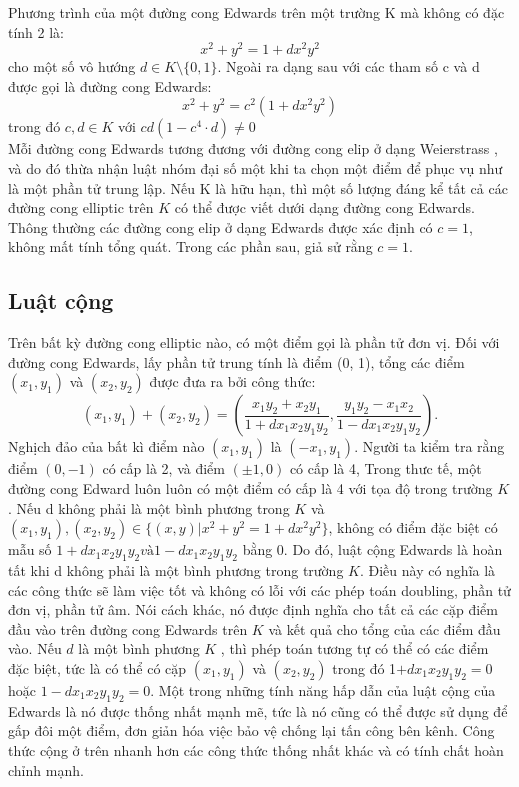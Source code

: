 \documentclass[a4paper,12pt]{report}
\begin{document}
Phương trình của một đường cong Edwards trên một trường K mà không có đặc tính 2 là:
\begin{displaymath}
x^{2}+y^{2}=1+dx^{2}y^{2}
\end{displaymath}
cho một số vô hướng  $d \in K \setminus \{0,1\}$. Ngoài ra dạng sau với các tham số c và d được gọi là đường cong Edwards:
\begin{displaymath}
x^2 + y^2 = c^2(1 + dx^2y^2)
\end{displaymath}
trong đó $c, d \in K$ với $cd(1 - c^4\cdot d) \neq 0$ \\
Mỗi đường cong Edwards tương đương với đường cong elip ở dạng Weierstrass , và do đó thừa nhận luật nhóm đại số một khi ta chọn một điểm để phục vụ như là một phần tử trung lập. Nếu K là hữu hạn, thì một số lượng đáng kể tất cả các đường cong elliptic trên $K$ có thể được viết dưới dạng đường cong Edwards. Thông thường các đường cong elip ở dạng Edwards được xác định có $c = 1$, không mất tính tổng quát. Trong các phần sau, giả sử rằng $c = 1$.
\subsection*{Luật cộng}
Trên bất kỳ đường cong elliptic nào, có một điểm gọi là phần tử đơn vị. Đối với đường cong Edwards, lấy phần tử trung tính là điểm (0, 1), tổng các điểm $(x_1,  y_1)$ và $(x_2 ,y_2)$ được đưa ra bởi công thức:
\begin{displaymath}
(x_1, y_1) + (x_2, y_2) = \left( \frac{x_1y_2 + x_2y_1}{1 + dx_1x_2y_1y_2}, \frac{y_1y_2 - x_1x_2}{1 - dx_1x_2y_1y_2} \right).
\end{displaymath}
Nghịch đảo của bất kì điểm nào $(x_1, y_1)$ là $(-x_1, y_1)$. Người ta kiểm tra rằng điểm $(0, -1)$ có cấp là 2, và điểm $(\pm 1, 0)$ có cấp là 4, Trong thưc tế, một đường cong Edward luôn luôn có một điểm có cấp là 4 với tọa độ trong trường $K$.
Nếu d không phải là một bình phương trong $K$ và $\displaystyle (x_{1}, y_{1}), (x_{2}, y_{2}) \in \{(x, y)|x^{2} + y^{2} = 1 + dx^{2}y^{2} \}$, không có điểm đặc biệt có mẫu số $1 +  dx_1x_2y_1y_2 và 1 -  dx_1 x_2y_1y_2$ bằng 0. Do đó, luật cộng Edwards là hoàn tất khi d không phải là một bình phương trong trường $K$. Điều này có nghĩa là các công thức sẽ làm việc tốt và không có lỗi với các phép toán doubling, phần tử đơn vị, phần tử âm. Nói cách khác, nó được định nghĩa cho tất cả các cặp điểm đầu vào trên đường cong Edwards trên $K$ và kết quả cho tổng của các điểm đầu vào.
Nếu $d$ là một bình phương $K$ , thì phép toán tương tự có thể có các điểm đặc biệt, tức là có thể có cặp $(x_1, y_1)$ và $(x_2, y_2)$ trong đó 1$ +  dx_1x_2y_1y_2 = 0$ hoặc $1 -  dx_1x_2y_1y_2 = 0$.
Một trong những tính năng hấp dẫn của luật cộng của Edwards là nó được thống nhất mạnh mẽ, tức là nó cũng có thể được sử dụng để gấp đôi một điểm, đơn giản hóa việc bảo vệ chống lại tấn công bên kênh. Công thức cộng ở trên nhanh hơn các công thức thống nhất khác và có tính chất hoàn chỉnh mạnh.
\end{document}
